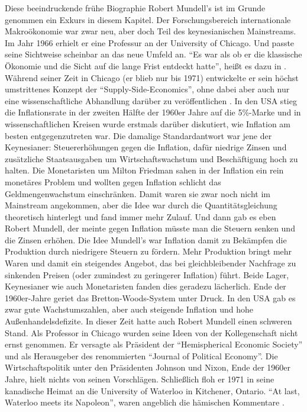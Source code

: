 Diese beeindruckende frühe Biographie Robert Mundell's ist im Grunde genommen ein Exkurs in diesem Kapitel. Der Forschungsbereich internationale Makroökonomie war zwar neu, aber doch Teil des keynesianischen Mainstreams. Im Jahr 1966 erhielt er eine Professur an der University of Chicago. Und passte seine Sichtweise scheinbar an das neue Umfeld an. "`Es war als ob er die klassische Ökonomie und die Sicht auf die lange Frist entdeckt hatte"', heißt es dazu in \textcite[S. 194]{Warsh}.
Während seiner Zeit in Chicago (er blieb nur bis 1971) entwickelte er sein höchst umstrittenes Konzept der "`Supply-Side-Economics"', ohne dabei aber auch nur eine wissenschaftliche Abhandlung darüber zu veröffentlichen \parencite[S. 192]{Warsh}. In den USA stieg die Inflationsrate in der zweiten Hälfte der 1960er Jahre auf die 5\%-Marke und in wissenschaftlichen Kreisen wurde erstmals darüber diskutiert, wie Inflation am besten entgegenzutreten war. Die damalige Standardantwort war jene der Keynesianer: Steuererhöhungen gegen die Inflation, dafür niedrige Zinsen und zusätzliche Staatsausgaben um Wirtschaftswachstum und Beschäftigung hoch zu halten. Die Monetaristen um Milton Friedman sahen in der Inflation ein rein monetäres Problem und wollten gegen Inflation schlicht das Geldmengenwachstum einschränken. Damit waren sie zwar noch nicht im Mainstream angekommen, aber die Idee war durch die Quantitätsgleichung theoretisch hinterlegt und fand immer mehr Zulauf. Und dann gab es eben Robert Mundell, der meinte gegen Inflation müsste man die Steuern senken und die Zinsen erhöhen. Die Idee Mundell's war Inflation damit zu Bekämpfen die Produktion durch niedrigere Steuern zu fördern. Mehr Produktion bringt mehr Waren und damit ein steigendes Angebot, das bei gleichbleibender Nachfrage zu sinkenden Preisen (oder zumindest zu geringerer Inflation) führt. Beide Lager, Keynesianer wie auch Monetaristen fanden dies geradezu lächerlich. Ende der 1960er-Jahre geriet das Bretton-Woods-System unter Druck. In den USA gab es zwar gute Wachstumszahlen, aber auch steigende Inflation und hohe Außenhandelsdefizite. In dieser Zeit hatte auch Robert Mundell einen schweren Stand. Als Professor in Chicago wurden seine Ideen von der Kollegenschaft nicht ernst genommen. Er versagte als Präsident der "`Hemispherical Economic Society"' und als Herausgeber des renommierten "`Journal of Political Economy"'\parencite[S. 195]{Warsh}. Die Wirtschaftspolitik unter den Präsidenten Johnson und Nixon, Ende der 1960er Jahre, hielt nichts von seinen Vorschlägen. Schließlich floh er 1971 in seine kanadische Heimat an die University of Waterloo in Kitchener, Ontario. "`At last, Waterloo meets its Napoleon"', waren angeblich die hämischen Kommentare \parencite[S. 195]{Warsh}.

